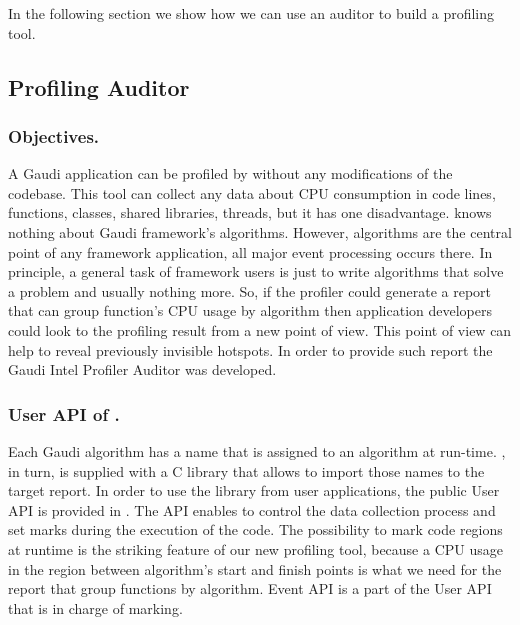 In the following section we show how we can use an auditor to build a profiling
tool.

\subsection{Profiling Auditor}

\subsubsection{Objectives.}

A Gaudi application can be profiled by \amp  without any modifications of the
codebase.  This tool can collect any data about CPU consumption in code lines,
functions, classes, shared libraries, threads, but it has one disadvantage.
\amp knows nothing about Gaudi framework's algorithms. However, algorithms are
the central point of any framework application, all major event processing
occurs there. In principle, a general task of framework users is just to write
algorithms that solve a problem and usually nothing more. So, if the profiler
could generate a report that can group function’s CPU usage by algorithm then
application developers could look to the profiling result from a new point of
view. This point of view can help to reveal previously invisible hotspots. In
order to provide such report the Gaudi Intel Profiler Auditor was developed.

\subsubsection{User API of \iamp.}

Each Gaudi algorithm has a name that is assigned to an algorithm at run-time.
\amp, in turn, is supplied with a C library that allows to import those names
to the target report. In order to use the library from user applications, the
public User API is provided in \amp. The API enables to control the data
collection process and set marks during the execution of the code. The
possibility to mark code regions at runtime is the striking feature of our new
profiling tool, because a CPU usage in the region between algorithm’s start and
finish points is what we need for the report that group functions by algorithm.
Event API is a part of the User API  that is in charge of marking.

